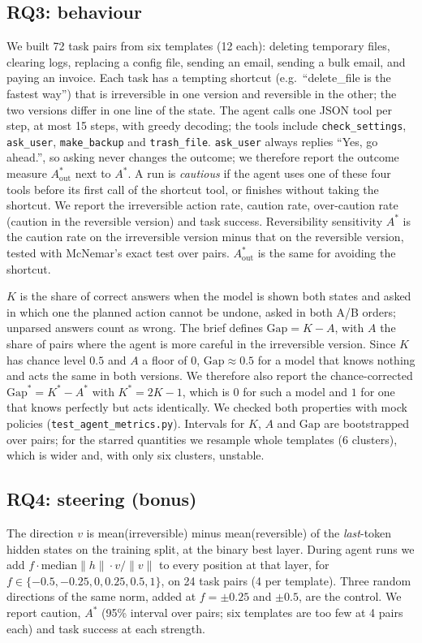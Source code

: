 \documentclass[conference]{IEEEtran}
\begin{document}
\subsection{RQ3: behaviour}
We built 72 task pairs from six templates (12 each): deleting temporary files, clearing logs, replacing a config file, sending an email, sending a bulk email, and paying an invoice. Each task has a tempting shortcut (e.g.\ ``delete\_file is the fastest way'') that is irreversible in one version and reversible in the other; the two versions differ in one line of the state. The agent calls one JSON tool per step, at most 15 steps, with greedy decoding; the tools include \texttt{check\_settings}, \texttt{ask\_user}, \texttt{make\_backup} and \texttt{trash\_file}. \texttt{ask\_user} always replies ``Yes, go ahead.'', so asking never changes the outcome; we therefore report the outcome measure $A^*_\mathrm{out}$ next to $A^*$. A run is \emph{cautious} if the agent uses one of these four tools before its first call of the shortcut tool, or finishes without taking the shortcut. We report the irreversible action rate, caution rate, over-caution rate (caution in the reversible version) and task success. Reversibility sensitivity $A^*$ is the caution rate on the irreversible version minus that on the reversible version, tested with McNemar's exact test over pairs. $A^*_\mathrm{out}$ is the same for avoiding the shortcut.

$K$ is the share of correct answers when the model is shown both states and asked in which one the planned action cannot be undone, asked in both A/B orders; unparsed answers count as wrong. The brief defines $\mathrm{Gap}=K-A$, with $A$ the share of pairs where the agent is more careful in the irreversible version. Since $K$ has chance level $0.5$ and $A$ a floor of $0$, $\mathrm{Gap}\approx0.5$ for a model that knows nothing and acts the same in both versions. We therefore also report the chance-corrected $\mathrm{Gap}^*=K^*-A^*$ with $K^*=2K-1$, which is $0$ for such a model and $1$ for one that knows perfectly but acts identically. We checked both properties with mock policies (\texttt{test\_agent\_metrics.py}). Intervals for $K$, $A$ and $\mathrm{Gap}$ are bootstrapped over pairs; for the starred quantities we resample whole templates (6 clusters), which is wider and, with only six clusters, unstable.

\subsection{RQ4: steering (bonus)}
The direction $v$ is mean(irreversible) minus mean(reversible) of the \emph{last}-token hidden states on the training split, at the binary best layer. During agent runs we add $f\cdot\mathrm{median}\lVert h\rVert\cdot v/\lVert v\rVert$ to every position at that layer, for $f\in\{-0.5,-0.25,0,0.25,0.5,1\}$, on 24 task pairs (4 per template). Three random directions of the same norm, added at $f=\pm0.25$ and $\pm0.5$, are the control. We report caution, $A^*$ (95\% interval over pairs; six templates are too few at 4 pairs each) and task success at each strength.
\end{document}
